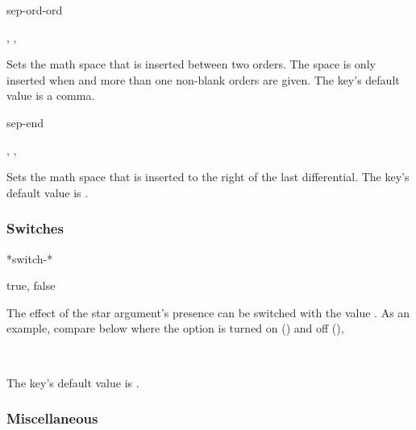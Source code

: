 	\begin{option}{sep-ord-ord}
		\begin{values}[default = {{,}}]
			, , 
		\end{values}
		Sets the math space that is inserted between two orders. The space is only inserted when  and more than one non-blank orders are given. The key's default value is a comma.
	\end{option}
	
	\begin{option}{sep-end}
		\begin{values}[default = \cs{mathop}\{\}\cs{!}]
			, , 
		\end{values}
		Sets the math space that is inserted to the right of the last differential. The key's default value is .
	\end{option}
	
	\subsubsection*{Switches}
	
	\begin{option}*{switch-*}
		\begin{values}[default = false]
			true, false
		\end{values}
		The effect of the star argument's presence can be switched with the value . As an example, compare below where the option is turned on () and off (),
		
		\begin{example}
			 \\
		\end{example}
		
		\noindent The key's default value is .
	\end{option}
	
	\subsubsection*{Miscellaneous}
	
